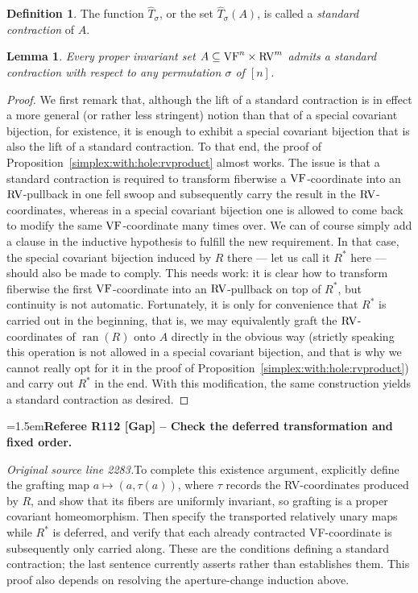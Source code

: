 \documentclass[12pt]{amsart}
\newcommand{\RefereeRemark}[4]{%
  \par\medskip\begingroup\normalfont\small\color{RefereePurple}%
  \emergencystretch=1.5em\noindent\textbf{Referee R#1 [#2] -- #3.}\par\nobreak\noindent #4\par
  \endgroup\medskip
}
\newcommand{\memph}[1]{{\color{magenta}\emph{#1}}}
\theoremstyle{plain}
\newtheorem{lem}[thm]{Lemma}
\theoremstyle{definition}
\newtheorem{defn}[thm]{Definition}
\theoremstyle{remark}
\numberwithin{equation}{section}
\theoremstyle{plain}
\newcommand{\VF}{\textup{VF}}
\newcommand{\RV}{\textup{RV}}
\DeclareMathOperator{\ran}{ran}
\newcommand{\0}{\emptyset}
\newcommand{\sub}{\subseteq}
\begin{document}
\begin{defn}\label{defn:standard:contraction}
The function $\hat T_{\sigma}$, or the set $\hat T_{\sigma}(A)$, is called a \memph{standard contraction} of  $A$.
\end{defn}



\begin{lem}\label{exit:stand}
Every proper invariant set $A \sub \VF^{n} \times \RV^{m}$  admits a standard contraction with respect to any permutation $\sigma$ of $[n]$.
\end{lem}
\begin{proof}
We first remark that, although the lift of a standard contraction is in effect a more general (or rather less stringent) notion than that of a special covariant bijection, for existence, it is enough to exhibit a special covariant bijection that is also the lift of a standard contraction. To that end, the proof of Proposition~\ref{simplex:with:hole:rvproduct} almost works. The  issue is that a standard contraction is required to transform fiberwise a $\VF$-coordinate into an $\RV$-pullback in one fell swoop and subsequently carry the result in the $\RV$-coordinates, whereas in a special covariant bijection one is allowed to come back to modify the same $\VF$-coordinate many times over. We can of course simply add a clause in the inductive hypothesis to fulfill the new requirement. In that case, the special covariant bijection induced by $R$ there --- let us call it $R^*$ here --- should also be made to comply. This needs work: it is clear how to transform fiberwise the first $\VF$-coordinate into an $\RV$-pullback on top of $R^*$, but continuity is not automatic. Fortunately, it is only for convenience that  $R^*$ is carried out in the beginning, that is, we may equivalently graft the $\RV$-coordinates of $\ran(R)$ onto $A$ directly in the obvious way (strictly speaking this operation is not allowed in  a special covariant bijection, and that is why we cannot really opt for it in the proof of Proposition~\ref{simplex:with:hole:rvproduct}) and carry out $R^*$ in the end. With this modification, the same construction yields a standard contraction as desired.
\end{proof}

\RefereeRemark{112}{Gap}{Check the deferred transformation and fixed order}{%
\textit{Original source line 2283.}\quad To complete this existence argument, explicitly define the grafting map $a\mapsto(a,\tau(a))$, where $\tau$ records the RV-coordinates produced by $R$, and show that its fibers are uniformly invariant, so grafting is a proper covariant homeomorphism. Then specify the transported relatively unary maps while $R^*$ is deferred, and verify that each already contracted VF-coordinate is subsequently only carried along. These are the conditions defining a standard contraction; the last sentence currently asserts rather than establishes them. This proof also depends on resolving the aperture-change induction above.
}
\end{document}
